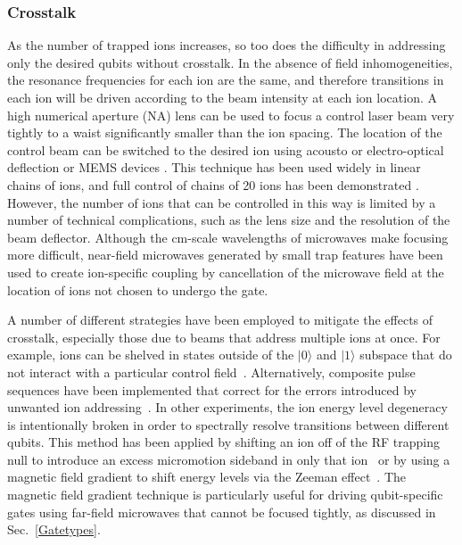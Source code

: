 \documentclass[%
12pt,
 amsmath,amssymb,
]{revtex4-2}
\begin{document}
    \subsubsection{Crosstalk}
As the number of trapped ions increases, so too does the difficulty in addressing only the desired qubits without crosstalk. In the absence of field inhomogeneities, the resonance frequencies for each ion are the same, and therefore transitions in each ion will be driven according to the beam intensity at each ion location. A high numerical aperture (NA) lens can be used to focus a control laser beam very tightly to a waist significantly smaller than the ion spacing. The location of the control beam can be switched to the desired ion using acousto or electro-optical deflection or MEMS devices \cite{KimMEMSMirror2007}. This technique has been used widely in linear chains of ions, and full control of chains of 20 ions has been demonstrated \cite{Friis20QubitEntanglement2018}. However, the number of ions that can be controlled in this way is limited by a number of technical complications, such as the lens size and the resolution of the beam deflector. Although the cm-scale wavelengths of microwaves make focusing more difficult, near-field microwaves generated by small trap features have been used to create ion-specific coupling \cite{PhysRevA.95.022337} by cancellation of the microwave field at the location of ions not chosen to undergo the gate.

A number of different strategies have been employed to mitigate the effects of crosstalk, especially those due to beams that address multiple ions at once. For example, ions can be shelved in states outside of the $|0\rangle$ and  $|1\rangle$  subspace that do not interact with a particular control field~\cite{RoosControl2004}.  Alternatively, composite pulse sequences have been implemented that correct for the errors introduced by unwanted ion addressing~\cite{herold2016universal}. In other experiments, the ion energy level degeneracy is intentionally broken in order to spectrally resolve transitions between different qubits. This method has been applied by shifting an ion off of the RF trapping null to introduce an excess micromotion sideband in only that ion~\cite{LeibfriedMicromotionAddress1999, AkermanUniversal2015} or by using a magnetic field gradient to shift energy levels via the Zeeman effect~\cite{MintertMicrowaveScheme2001, Timoney2011, PiltzLowCrosstalk2014}. The magnetic field gradient technique is particularly useful for driving qubit-specific gates using far-field microwaves that cannot be focused tightly, as discussed in Sec.~\ref{Gatetypes}.
\end{document}
